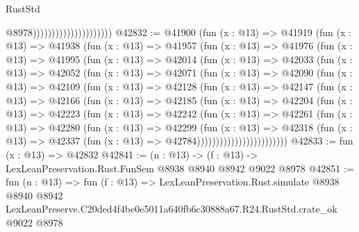 \begin{lexlean}{RustStd}
\begin{coremodule}
                                              @8978)))))))))))))))))))))
@42832 := @41900
    (fun (x : @13) =>
    @41919
      (fun (x : @13) =>
      @41938
        (fun (x : @13) =>
        @41957
          (fun (x : @13) =>
          @41976
            (fun (x : @13) =>
            @41995
              (fun (x : @13) =>
              @42014
                (fun (x : @13) =>
                @42033
                  (fun (x : @13) =>
                  @42052
                    (fun (x : @13) =>
                    @42071
                      (fun (x : @13) =>
                      @42090
                        (fun (x : @13) =>
                        @42109
                          (fun (x : @13) =>
                          @42128
                            (fun (x : @13) =>
                            @42147
                              (fun (x : @13) =>
                              @42166
                                (fun (x : @13) =>
                                @42185
                                  (fun (x : @13) =>
                                  @42204
                                    (fun (x : @13) =>
                                    @42223
                                      (fun (x : @13) =>
                                      @42242
                                        (fun (x : @13) =>
                                        @42261
                                          (fun (x : @13) =>
                                          @42280
                                            (fun (x : @13) =>
                                            @42299
                                              (fun (x : @13) =>
                                              @42318
                                                (fun (x : @13) =>
                                                @42337
                                                  (fun (x : @13) => @42784))))))))))))))))))))))))
@42833 := fun (x : @13) => @42832
@42841 := (n : @13) -> (f : @13) -> LexLeanPreservation.Rust.FunSem @8938 @8940 @8942 @9022 @8978
@42851 := fun (n : @13) =>
  fun (f : @13) =>
  LexLeanPreservation.Rust.simulate
    @8938
    @8940
    @8942
    LexLeanPreserve.C20ded4f4be0e5011a640fb6c30888a67.R24.RustStd.crate_ok
    @9022
    @8978
\end{coremodule}
\end{lexlean}
